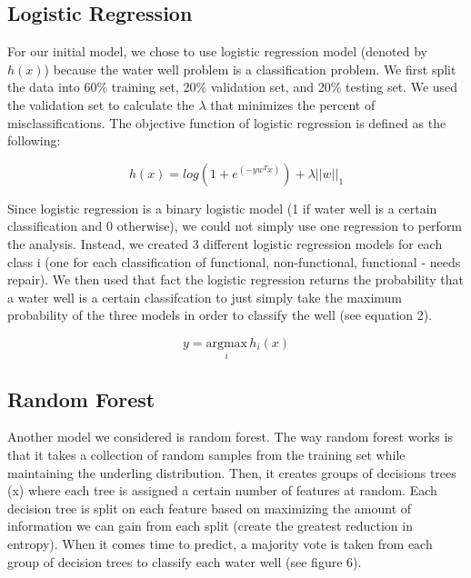 \documentclass[10pt]{SelfArx} %
\begin{document}
\subsection{Logistic Regression}

For our initial model, we chose to use logistic regression model (denoted by $h(x)$) because the water well problem is a classification problem. We first split the data into 60\% training set, 20\% validation set, and 20\% testing set. We used the validation set to calculate the $\lambda$ that minimizes the percent of misclassifications. The objective function of logistic regression is defined as the following: 

\begin{equation}
 h(x) = log(1+e^{(-yw^Tx)}) + \lambda||w||_1
\end{equation}

Since logistic regression is a binary logistic model (1 if water well is a certain classification and 0 otherwise), we could not simply use one regression to perform the analysis. Instead, we created 3 different logistic regression models for each class i (one for each classification of functional, non-functional, functional - needs repair). We then used that fact the logistic regression returns the probability that a water well is a certain classifcation to just simply take the maximum probability of the three models in order to classify the well (see equation 2).

\begin{equation}
 y= \underset{i}{\mathrm{argmax}}\, h_i(x) 
\end{equation}

\subsection{Random Forest}

Another model we considered is random forest. The way random forest works is that it takes a collection of random samples from the training set while maintaining the underling distribution. Then, it creates groups of decisions trees (x) where each tree is assigned a certain number of features at random. Each decision tree is split on each feature based on maximizing the amount of information we can gain from each split (create the greatest reduction in entropy). When it comes time to predict, a majority vote is taken from each group of decision trees to classify each water well (see figure 6).  
\\[-1.5\baselineskip]
\break
\end{document}
